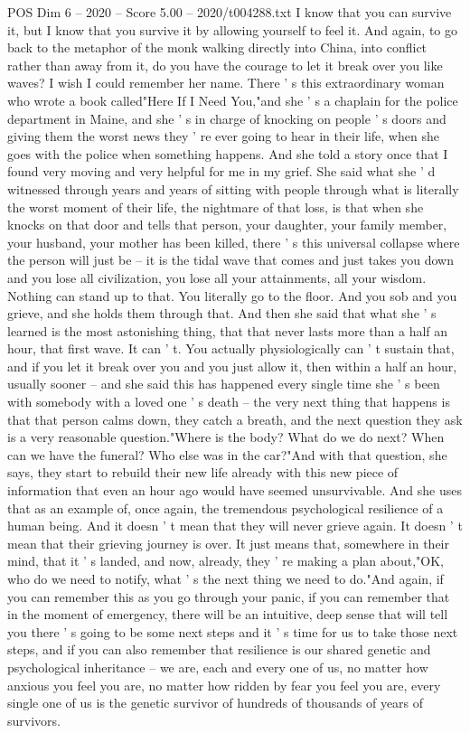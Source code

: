 \begin{textsample}{POS Dim 6 – 2020 – Score 5.00 – 2020/t004288.txt}
I know that you can survive it, but I know that you survive it by allowing yourself to feel it.
And again, to go back to the metaphor of the monk walking directly into China, into conflict rather than away from it, do you have the courage to let it break over you like waves?
I wish I could remember her name.
There ' s this extraordinary woman who wrote a book called"Here If I Need You,"and she ' s a chaplain for the police department in Maine, and she ' s in charge of knocking on people ' s doors and giving them the worst news they ' re ever going to hear in their life, when she goes with the police when something happens.
And she told a story once that I found very moving and very helpful for me in my grief.
She said what she ' d witnessed through years and years of sitting with people through what is literally the worst moment of their life, the nightmare of that loss, is that when she knocks on that door and tells that person, your daughter, your family member, your husband, your mother has been killed, there ' s this universal collapse where the person will just be -- it is the tidal wave that comes and just takes you down and you lose all civilization, you lose all your attainments, all your wisdom.
Nothing can stand up to that.
You literally go to the floor.
And you sob and you grieve, and she holds them through that.
And then she said that what she ' s learned is the most astonishing thing, that that never lasts more than a half an hour, that first wave.
It can ' t.
You actually physiologically can ' t sustain that, and if you let it break over you and you just allow it, then within a half an hour, usually sooner -- and she said this has happened every single time she ' s been with somebody with a loved one ' s death -- the very next thing that happens is that that person calms down, they catch a breath, and the next question they ask is a very reasonable question."Where is the body?
What do we do next?
When can we have the funeral?
Who else was in the car?"And with that question, she says, they start to rebuild their new life already with this new piece of information that even an hour ago would have seemed unsurvivable.
And she uses that as an example of, once again, the tremendous psychological resilience of a human being.
And it doesn ' t mean that they will never grieve again.
It doesn ' t mean that their grieving journey is over.
It just means that, somewhere in their mind, that it ' s landed, and now, already, they ' re making a plan about,"OK, who do we need to notify, what ' s the next thing we need to do."And again, if you can remember this as you go through your panic, if you can remember that in the moment of emergency, there will be an intuitive, deep sense that will tell you there ' s going to be some next steps and it ' s time for us to take those next steps, and if you can also remember that resilience is our shared genetic and psychological inheritance -- we are, each and every one of us, no matter how anxious you feel you are, no matter how ridden by fear you feel you are, every single one of us is the genetic survivor of hundreds of thousands of years of survivors.

\end{textsample}

